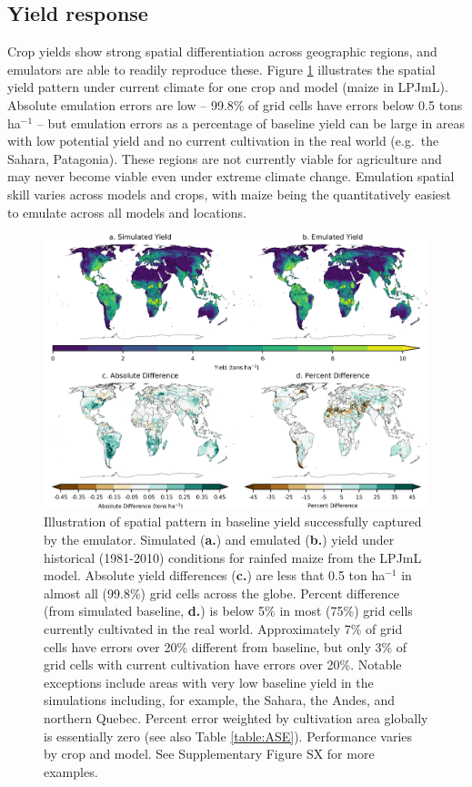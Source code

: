\documentclass[gmd, manuscript]{copernicus} %
\begin{document}
\subsection{Yield response}
Crop yields show strong spatial differentiation across geographic regions, and emulators are able to readily reproduce these. Figure \ref{fig:map_pattern} illustrates the spatial yield pattern under current climate for one crop and model (maize in LPJmL). Absolute emulation errors are low --  99.8\% of grid cells have errors below 0.5 tons ha$^{-1}$ -- but 
emulation errors as a percentage of baseline yield can be large in areas with low potential yield and no current cultivation in the real world (e.g.\ the Sahara, Patagonia).
These regions are not currently viable for agriculture and may never become viable even under extreme climate change.  
Emulation spatial skill varies across models and crops, with maize being the quantitatively easiest to emulate across all models and locations.

\begin{figure}[ht]
\centering
    \includegraphics[width=16.0cm]{figures/lpjml_maize.png}
    \caption{
    Illustration of spatial pattern in baseline yield successfully captured by the emulator.
    Simulated (\textbf{a.}) and emulated (\textbf{b.}) yield under historical (1981-2010) conditions for rainfed maize from the LPJmL model.
    Absolute yield differences (\textbf{c.}) are less that 0.5 ton ha$^{-1}$ in almost all (99.8\%) grid cells across the globe.
    Percent difference (from simulated baseline, \textbf{d.}) is below 5\% in most (75\%) grid cells currently cultivated in the real world.
    Approximately 7\% of grid cells have errors over 20\% different from baseline, but only 3\% of grid cells with current cultivation have errors over 20\%.
    Notable exceptions include areas with very low baseline yield in the simulations including, for example, the Sahara, the Andes, and northern Quebec. 
    Percent error weighted by cultivation area globally is essentially zero (see also Table \ref{table:ASE}).
    Performance varies by crop and model. 
    See Supplementary Figure SX for more examples.
    }
   \label{fig:map_pattern}
\end{figure}
\end{document}
